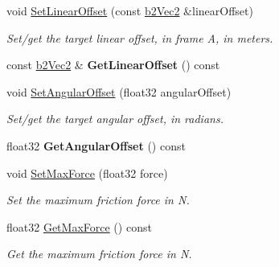 \begin{DoxyCompactItemize}
void \mbox{\hyperlink{classb2MotorJoint_a99254b5fc9ed9f2d0fdccada513000c3}{Set\+Linear\+Offset}} (const \mbox{\hyperlink{structb2Vec2}{b2\+Vec2}} \&linear\+Offset)
\begin{DoxyCompactList}\small\item\em Set/get the target linear offset, in frame A, in meters. \end{DoxyCompactList}\item 
\mbox{\label{classb2MotorJoint_a87a61f162e202e2f3c12200e42e3b180}} 
const \mbox{\hyperlink{structb2Vec2}{b2\+Vec2}} \& {\bfseries Get\+Linear\+Offset} () const
\item 
\mbox{\label{classb2MotorJoint_a14d7dca1767548ddffe293e39cafc3c7}} 
void \mbox{\hyperlink{classb2MotorJoint_a14d7dca1767548ddffe293e39cafc3c7}{Set\+Angular\+Offset}} (float32 angular\+Offset)
\begin{DoxyCompactList}\small\item\em Set/get the target angular offset, in radians. \end{DoxyCompactList}\item 
\mbox{\label{classb2MotorJoint_a4dc4e5ee4ec8615c3d712ea6cac48436}} 
float32 {\bfseries Get\+Angular\+Offset} () const
\item 
\mbox{\label{classb2MotorJoint_a62f95f23d60123cebe14f2fcec155801}} 
void \mbox{\hyperlink{classb2MotorJoint_a62f95f23d60123cebe14f2fcec155801}{Set\+Max\+Force}} (float32 force)
\begin{DoxyCompactList}\small\item\em Set the maximum friction force in N. \end{DoxyCompactList}\item 
\mbox{\label{classb2MotorJoint_ac7353eace38d2593a523149abe8ec2b5}} 
float32 \mbox{\hyperlink{classb2MotorJoint_ac7353eace38d2593a523149abe8ec2b5}{Get\+Max\+Force}} () const
\begin{DoxyCompactList}\small\item\em Get the maximum friction force in N. \end{DoxyCompactList}\item 
\mbox{\label{classb2MotorJoint_a3e9a259d36c36e0dc078282e6799d625}} 

\end{DoxyCompactItemize}
